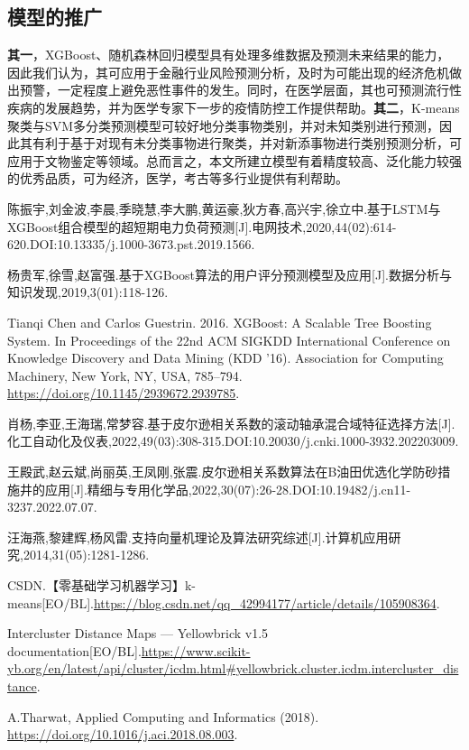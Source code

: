 \documentclass{MathModeling}
\begin{document}
	\subsection{模型的推广}
	\textbf{其一}，XGBoost、随机森林回归模型具有处理多维数据及预测未来结果的能力，因此我们认为，其可应用于金融行业风险预测分析，及时为可能出现的经济危机做出预警，一定程度上避免恶性事件的发生。同时，在医学层面，其也可预测流行性疾病的发展趋势，并为医学专家下一步的疫情防控工作提供帮助。\textbf{其二}，K-means聚类与SVM多分类预测模型可较好地分类事物类别，并对未知类别进行预测，因此其有利于基于对现有未分类事物进行聚类，并对新添事物进行类别预测分析，可应用于文物鉴定等领域。总而言之，本文所建立模型有着精度较高、泛化能力较强的优秀品质，可为经济，医学，考古等多行业提供有利帮助。
	\newpage
	\begin{spacing}{1.08}
	\begin{thebibliography}{99}
	陈振宇,刘金波,李晨,季晓慧,李大鹏,黄运豪,狄方春,高兴宇,徐立中.基于LSTM与XGBoost组合模型的超短期电力负荷预测[J].电网技术,2020,44(02):614-620.DOI:10.13335/j.1000-3673.pst.2019.1566.

	杨贵军,徐雪,赵富强.基于XGBoost算法的用户评分预测模型及应用[J].数据分析与知识发现,2019,3(01):118-126.

	Tianqi Chen and Carlos Guestrin. 2016. XGBoost: A Scalable Tree Boosting System. In Proceedings of the 22nd ACM SIGKDD International Conference on Knowledge Discovery and Data Mining (KDD '16). Association for Computing Machinery, New York, NY, USA, 785–794. \url{https://doi.org/10.1145/2939672.2939785}.

	肖杨,李亚,王海瑞,常梦容.基于皮尔逊相关系数的滚动轴承混合域特征选择方法[J].化工自动化及仪表,2022,49(03):308-315.DOI:10.20030/j.cnki.1000-3932.202203009.
	
	王殿武,赵云斌,尚丽英,王凤刚,张震.皮尔逊相关系数算法在B油田优选化学防砂措施井的应用[J].精细与专用化学品,2022,30(07):26-28.DOI:10.19482/j.cn11-3237.2022.07.07.

	汪海燕,黎建辉,杨风雷.支持向量机理论及算法研究综述[J].计算机应用研究,2014,31(05):1281-1286.

	CSDN.【零基础学习机器学习】k-means[EO/BL].\url{https://blog.csdn.net/qq_42994177/article/details/105908364}.

	Intercluster Distance Maps — Yellowbrick v1.5 documentation[EO/BL].\url{https://www.scikit-yb.org/en/latest/api/cluster/icdm.html#yellowbrick.cluster.icdm.intercluster_distance}.

	A.Tharwat, Applied Computing and Informatics (2018). \url{https://doi.org/10.1016/j.aci.2018.08.003}.

	\end{thebibliography}
	\end{spacing}
	\newpage
\end{document}
